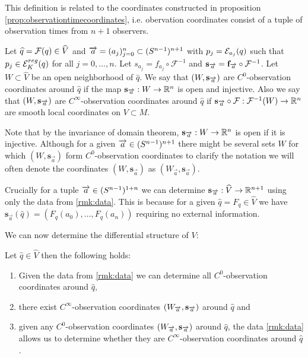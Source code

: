 This definition is related to the coordinates constructed in proposition \ref{prop:observationtimecoordinates}, i.e. obervation coordinates consist of a tuple of observation times from $n+1$ observers.
\begin{definition}
Let $\widehat{q}=\F(q)\in \widehat{V}$ and $\aa = (a_j)^n_{j=0}\subset (\sn)^{n+1}$ with $p_j = \mc{E}_{a_j}(q)$ such that $p_j\in \er(q)$ for all $j=0,\dots,n$. Let $s_{a_j} = f_{a_j} \circ \mathcal{F}^{-1}$ and $\mathbf{s}_{\overrightarrow{a}}=\mathbf{f}_{\overrightarrow{a}}\circ\mc{F}^{-1}$. Let $W\subset\widehat{V}$ be an open neighborhood of $\widehat{q}$. We say that $(W,\mathbf{s}_\aa)$ are $C^0$-observation coordinates around $\widehat{q}$ if the map $\mathbf{s}_\aa:W\to \R^n$ is open and injective. Also we say that $(W,\mathbf{s}_\aa)$ are $C^\infty$-observation coordinates around $\widehat{q}$ if $\mathbf{s}_{\overrightarrow{a}}\circ\mc{F}:\mc{F}^{-1}(W)\to \R^n$ are smooth local coordinates on $V\subset M$.
\end{definition}
Note that by the invariance of domain theorem, $\mathbf{s}_{\overrightarrow{a}}:W\to \R^n$ is open if it is injective.
Although for a given $\overrightarrow{a}\in (\sn)^{n+1}$ there might be several sets $W$ for which $(W,\mathbf{s}_{\overrightarrow{a}})$ form $C^0$-observation coordinates to clarify the notation we will often denote the coordinates $(W,\mathbf{s}_{\overrightarrow{a}})$ as $(W_{\overrightarrow{a}},\mathbf{s}_{\overrightarrow{a}})$. 

Crucially for a tuple $\overrightarrow{a}\in (\sn)^{1+n}$ we can determine $\mathbf{s}_{\overrightarrow{a}}:\widehat{V}\to \R^{n+1}$ using only the data from \ref{rmk:data}. This is because for a given $\widehat{q}=F_q\in \widehat{V}$ we have $\mathbf{s}_{\overrightarrow{a}}(\widehat{q}) = (F_q(a_0),\dots,F_q(a_n))$ requiring no external information.

We can now determine the differential structure of $V$:
\begin{proposition}\label{prop:findsmoothcoords}
Let  $\widehat{q}\in \widehat{V}$ then the following holds:
\begin{enumerate}[label={\textnormal{(\arabic*)}}]
    \item Given the data from \ref{rmk:data} we can determine all $C^0$-observation coordinates around $\widehat{q}$,
    \item there exist $C^\infty$-observation coordinates $(W_\aa,\mathbf{s}_\aa)$ around $\widehat{q}$ and
    \item given any $C^0$-observation coordinates $(W_\aa,\mathbf{s}_\aa)$ around $\widehat{q}$, the data \ref{rmk:data} allows us to determine whether they are $C^\infty$-observation coordinates around $\widehat{q}$.
\end{enumerate}
\end{proposition}

